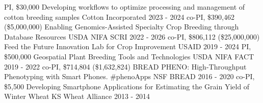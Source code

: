 \begin{cvgrants}
  \cvgrant
    {PI, \$30,000}
    {Developing workflows to optimize processing and management of cotton breeding samples}
    {Cotton Incorporated} %
    {2023 - 2024}
    {
    }
  \cvgrant
    {co-PI, \$390,462 (\$5,000,000)}
    {Enabling Genomics-Assisted Specialty Crop Breeding through Database Resources}
    {USDA NIFA SCRI} %
    {2022 - 2026}
    {
    }
  \cvgrant
    {co-PI, \$806,112 (\$25,000,000)}
    {Feed the Future Innovation Lab for Crop Improvement}
    {USAID} %
    {2019 - 2024}
    {
    }
  \cvgrant
    {PI, \$500,000} %
    {Geospatial Plant Breeding Tools and Technologies}
    {USDA NIFA FACT} %
    {2019 - 2022}
    {
    }
  \cvgrant
    {co-PI, \$714,804 (\$1,632,824)} %
    {BREAD PHENO: High-Throughput Phenotyping with Smart Phones. \#phenoApps}
    {NSF BREAD} %
    {2016 - 2020}
    {
    }
  \cvgrant
    {co-PI, \$5,500} %
    {Developing Smartphone Applications for Estimating the Grain Yield of Winter Wheat}
    {KS Wheat Alliance}
    {2013 - 2014}
    {
    }
\end{cvgrants}
